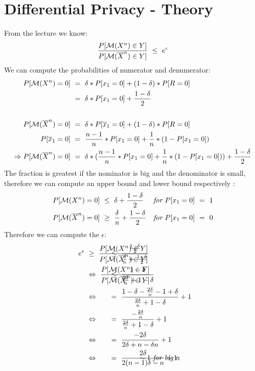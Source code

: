 \documentclass{report}
\begin{document}
	\section{Differential Privacy - Theory}
	\startsection
		From the lecture we know:
		\[
			\frac{P[\fancyletter{M}(X^n) \in Y]}{P[\fancyletter{M}(\overline{X}^n) \in Y]} \ \leq \ e^{\epsilon}
		\]
		We can compute the probabilities of numerator and denumerator:
		\begin{align*}
			P[\mathcal{M}(X^n) = 0 ] \ & = \ \delta * P[x_1 = 0] + (1-\delta) * P[R = 0] \\
			& = \ \delta * P[x_1 = 0] + \frac{1-\delta}{2} \\
			\\
			P[\mathcal{M}(\overline{X}^n) = 0 ] \ & = \ \delta * P[\overline{x}_1 = 0] + (1-\delta) * P[R = 0] \\
			P[\overline{x}_1 = 0] \ & = \ \frac{n-1}{n} * P[x_1 = 0] + \frac{1}{n} * (1 - P[x_1 = 0]) \\
			\Rightarrow P[\mathcal{M}(\overline{X}^n) = 0 ] \ & = \ \delta * (\frac{n-1}{n} * P[x_1 = 0] + \frac{1}{n} * (1 - P[x_1 = 0])) + \frac{1-\delta}{2}
		\end{align*}
		The fraction is greatest if the nominator is big and the denominator is small, therefore we can compute an upper bound and lower bound respectively :
		\begin{align*}
			P[\fancyletter{M}(X^n) = 0 ] \ & \leq \ \delta + \frac{1-\delta}{2} && \textit{for $P[x_1 = 0] \ = \ 1$} \\
			P[\fancyletter{M}(\overline{X}^n) = 0 ] \ & \geq \ \frac{\delta}{n} + \frac{1 - \delta}{2} && \textit{for $P[x_1 = 0] \ = \ 0$}
		\end{align*}
		Therefore we can compute the $\epsilon$:
		\begin{align*}
			e^{\epsilon} \ & \geq \ \frac{P[\fancyletter{M}(X^n) \in Y]}{P[\fancyletter{M}(\overline{X}^n) \in Y]} \ && \hspace*{-2.5cm} \leq \ \frac{\frac{1-\delta}{2}}{\frac{\delta}{n} + \frac{1 - \delta}{2}} \\
			& \Leftrightarrow \ \frac{P[\fancyletter{M}(X^n) \in Y]}{P[\fancyletter{M}(\overline{X}^n) \in Y]} \ && \hspace*{-2.5cm} \leq \ \frac{1 - \delta}{\frac{2\delta}{n} + 1 - \delta } \\
			& \Leftrightarrow && \hspace*{-2.5cm} = \ \frac{1 - \delta - \frac{2 \delta}{n} - 1 + \delta}{\frac{2 \delta}{n} + 1 - \delta} + 1 \\
			& \Leftrightarrow && \hspace*{-2.5cm} = \ \frac{-\frac{2 \delta}{n}}{\frac{2 \delta}{n} + 1 - \delta} + 1 \\
			& \Leftrightarrow && \hspace*{-2.5cm} = \ \frac{-2 \delta}{2 \delta + n - \delta n} + 1 \\
			& \Leftrightarrow && \hspace*{-2.5cm} = \ \frac{2 \delta}{2 (n-1) \delta - n} + 1 && \hspace*{-3cm} \sim 1 \ \textit{for big $n$}\\
		\end{align*}
\end{document}
